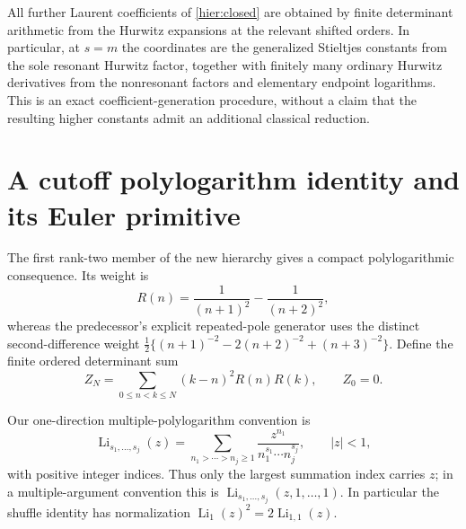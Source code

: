 \documentclass[11pt]{article}
\theoremstyle{definition}
\theoremstyle{remark}
\numberwithin{equation}{section}
\begin{document}
All further Laurent coefficients of \eqref{hier:closed} are obtained
by finite determinant arithmetic from the Hurwitz expansions at the
relevant shifted orders.  In particular, at $s=m$ the coordinates are
the generalized Stieltjes constants from the sole resonant Hurwitz
factor, together with finitely many ordinary Hurwitz derivatives from
the nonresonant factors and elementary endpoint logarithms.  This is
an exact coefficient-generation procedure, without a claim that the
resulting higher constants admit an additional classical reduction.


\section{A cutoff polylogarithm identity and its Euler primitive}
\label{hier:gf-section}

The first rank-two member of the new hierarchy gives a compact
polylogarithmic consequence.  Its weight is
\begin{equation}\label{hier:gf-weight}
 R(n)=\frac1{(n+1)^2}-\frac1{(n+2)^2},
\end{equation}
whereas the predecessor's explicit repeated-pole generator uses the
distinct second-difference weight
$\tfrac12\{(n+1)^{-2}-2(n+2)^{-2}+(n+3)^{-2}\}$.
Define the finite ordered determinant sum
\begin{equation}\label{hier:gf-cutoff}
 Z_N=\sum_{0\le n<k\le N}(k-n)^2R(n)R(k),\qquad Z_0=0.
\end{equation}

Our one-direction multiple-polylogarithm convention is
\begin{equation}\label{hier:gf-convention}
 \operatorname{Li}_{s_1,\ldots,s_j}(z)
 =\sum_{n_1>\cdots>n_j\ge1}
       \frac{z^{n_1}}{n_1^{s_1}\cdots n_j^{s_j}},
 \qquad |z|<1,
\end{equation}
with positive integer indices.  Thus only the largest summation index
carries $z$; in a multiple-argument convention this is
$\operatorname{Li}_{s_1,\ldots,s_j}(z,1,\ldots,1)$.
In particular the shuffle identity has normalization
$\operatorname{Li}_1(z)^2=2\operatorname{Li}_{1,1}(z)$.
\end{document}
